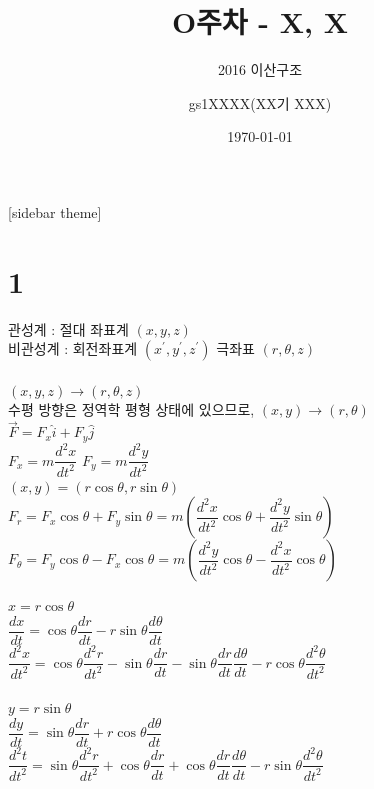 \documentclass[11pt]{beamer}
\title[O주차 - X, X]{O주차 - X, X}
\subtitle[]{2016 이산구조}
\author[]{gs1XXXX(XX기 XXX)}
\institute[GSHS]{경기과학고등학교}
\date[]{\today}
\begin{document}
\begin{frame}[plain]
\titlepage
\end{frame}
[sidebar theme]



\section{1}
\begin{frame}{1.1}\footnotesize

	관성계 : 절대 좌표계 $ (x, y, z)$ \\
	비관성계 : 회전좌표계 $ (x^{\prime}, y^{\prime}, z^{\prime})$ 
	극좌표 $ (r, \theta, z)$\\
	\\
	$ (x, y, z) 	\rightarrow (r, \theta, z)$\\
	수평 방향은 정역학 평형 상태에 있으므로, 	
	$ (x, y) 	\rightarrow (r, \theta)$\\
	
	$ \overrightarrow {F} = F_{x} \hat{i}  + F_{y} \hat{j} $\\
	
	$ F_{x} = m \dfrac{d^{2}x}{dt^{2}}$
	$ F_{y} = m \dfrac{d^{2}y}{dt^{2}}$\\
	
	$ (x, y) = (r \cos \theta, r \sin \theta)$\\
	
	$ F_{r} = F_{x} \cos \theta + F_{y} \sin \theta 
	= m \left ( \dfrac{d^{2}x}{dt^{2}} \cos \theta + \dfrac{d^{2}y}{dt^{2}} \sin \theta \right) $\\
	
	$ F_{\theta} = F_{y} \cos \theta - F_{x} \cos \theta 
	= m \left ( \dfrac{d^{2}y}{dt^{2}} \cos \theta - \dfrac{d^{2}x}{dt^{2}} \cos \theta \right) $\\
	
\end{frame}

\begin{frame}{1.2}\footnotesize

	$ x = r \cos \theta $ \\
	
	$\dfrac{dx}{dt} = \cos \theta \dfrac{dr}{dt} - r \sin \theta \dfrac{d\theta}{dt}$ \\
	
	$\dfrac{d^{2}x}{dt^{2}} = \cos \theta \dfrac{d^{2}r}{dt^{2}} - \sin \theta \dfrac{dr}{dt} - \sin \theta \dfrac{dr}{dt} \dfrac{d\theta}{dt} -r \cos \theta \dfrac{d^{2}\theta}{dt^{2}}$\\
	\\
	$ y = r \sin \theta $ \\
	
	$\dfrac{dy}{dt} = \sin \theta \dfrac{dr}{dt} + r \cos \theta \dfrac{d\theta}{dt}$ \\

	$\dfrac{d^{2}t}{dt^{2}} = \sin \theta \dfrac{d^{2}r}{dt^{2}} + \cos \theta \dfrac{dr}{dt} + \cos \theta \dfrac{dr}{dt} \dfrac{d\theta}{dt} -r \sin \theta \dfrac{d^{2}\theta}{dt^{2}}$\\
	\\

\end{frame}
\end{document}
